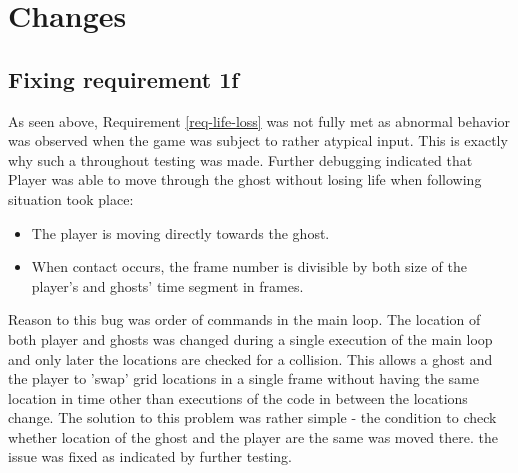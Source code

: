 \documentclass[11pt,a4paper,notitlepage]{report}
\newcommand{\dsubsection}[1]{\FloatBarrier \subsection{#1}}
\begin{document}
		\section{Changes}
			\dsubsection{Fixing requirement 1f}
				As seen above, Requirement \ref{req-life-loss} was not fully met as abnormal behavior was observed when the game was subject to rather atypical input. This is exactly why such a throughout testing was made. Further debugging indicated that Player was able to move through the ghost without losing life when following situation took place:\\
				\begin{itemize}
					\item The player is moving directly towards the ghost.
					\item When contact occurs, the frame number is divisible by both size of the player's and ghosts' time segment in frames.
				\end{itemize}
				Reason to this bug was order of commands in the main loop. The location of both player and ghosts was changed during a single execution of the main loop and only later the locations are checked for a collision. This allows a ghost and the player to 'swap' grid locations in a single frame without having the same location in time other than executions of the code in between the locations change. The solution to this problem was rather simple - the condition to check whether location of the ghost and the player are the same was moved there. the issue was fixed as indicated by further testing.
				
\end{document}
